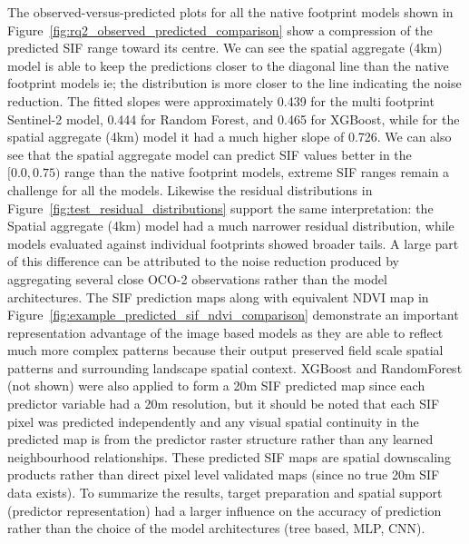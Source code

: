 The observed-versus-predicted plots for all the native footprint models shown in Figure~\ref{fig:rq2_observed_predicted_comparison} show a   compression of the predicted SIF range toward its centre. We can see the spatial aggregate (4km) model is able to keep the predictions closer to the diagonal line than the native footprint models ie; the distribution is more closer to the line indicating the noise reduction. The fitted slopes were approximately 0.439 for the multi footprint Sentinel-2 model, 0.444 for Random Forest, and 0.465 for XGBoost, while for the spatial aggregate (4km) model it had a much higher slope of 0.726. We can also see that the spatial aggregate model can predict SIF values better in the  $[0.0,0.75)$ range than the native footprint models, extreme SIF ranges remain a challenge for all the models. Likewise the residual distributions in Figure~\ref{fig:test_residual_distributions} support the same interpretation: the Spatial aggregate (4km) model had a much narrower residual distribution, while models evaluated against individual footprints showed broader tails. A large part of this difference can be attributed to the noise reduction produced by aggregating several close OCO-2 observations rather than the model architectures. The SIF prediction maps along with equivalent NDVI map in Figure~\ref{fig:example_predicted_sif_ndvi_comparison}
demonstrate an important representation advantage of the image based models as they are able to reflect much more complex patterns because their output preserved field scale spatial patterns and surrounding landscape spatial context. XGBoost and RandomForest (not shown) were also applied to form a 20m SIF predicted map since each predictor variable had a 20m resolution, but it should be noted that each SIF pixel was predicted independently and any visual spatial continuity in the predicted map is from the predictor raster structure rather than any learned neighbourhood relationships. These predicted SIF maps are spatial downscaling products rather than direct pixel level validated maps (since no true 20m SIF data exists). To summarize the results, target preparation and spatial support (predictor representation) had a larger influence on the accuracy of prediction rather than the choice of the model architectures (tree based, MLP, CNN). 


